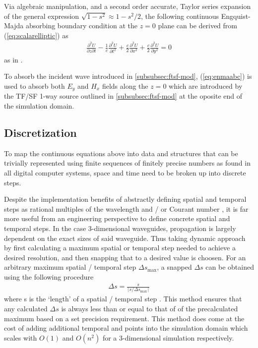 Via algebraic manipulation, and a second order accurate, Taylor series expansion of the general expression $\sqrt{1-s^2}\approx1-s^2/2$, the following continuous Engquist-Majda absorbing boundary condition at the $z=0$ plane can be derived from  (\ref{eq:scalarelliptic}) as
\begin{align}
	\frac{\partial^2 U}{\partial z\partial t}-\frac{1}{c}\frac{\partial^2 U}{\partial t^2}+\frac{c}{2}\frac{\partial^2 U}{\partial x^2}+\frac{c}{2}\frac{\partial^2 U}{\partial y^2}=0
	\label{eq:enmaabc}
\end{align}
as in \cite{taftlovefdtd}.

To absorb the incident wave introduced in \ref{subsubsec:ftsf-mod},  (\ref{eq:enmaabc}) is used to absorb both $E_y$ and $H_x$ fields along the $z=0$ which are introduced by the TF/SF 1-way source outlined in \ref{subsubsec:ftsf-mod} at the oposite end of the simulation domain.

\subsection{Discretization}
\label{subsec:discretization}
To map the continuous equations above into data and structures that can be trivially represented using finite sequences of finitely precise numbers as found in all digital computer systems, space and time need to be broken up into discrete steps.

Despite the implementation benefits of abstractly defining spatial and temporal steps as rational multiples of the wavelength and / or Courant number \cite{ufdtd}, it is far more useful from an engineering perspective to define concrete spatial and temporal steps. In the case 3-dimensional waveguides, propagation is largely dependent on the exact sizes of said waveguide. Thus taking dynamic approach by first calculating a maximum spatial or temporal step needed to achieve a desired resolution, and then snapping that to a desired value is choosen. For an arbitrary maximum spatial / temporal step $\Delta s_{\max}$, a snapped $\Delta s$ can be obtained using the following procedure
\begin{align}
	\Delta s = \frac{s}{\lceil s / \Delta s_{\max}\rceil}
	\label{eq:snapping}
\end{align}
where s is the `length' of a spatial / temporal step \cite{empossible}. This method ensures that any calculated $\Delta s$ is always less than or equal to that of of the precalculated maximum based on a set precision requirement. This method does come at the cost of adding additional temporal and points into the simulation domain which scales with $O(1)$ and $O(n^2)$ for a 3-dimensional simulation respectively.

